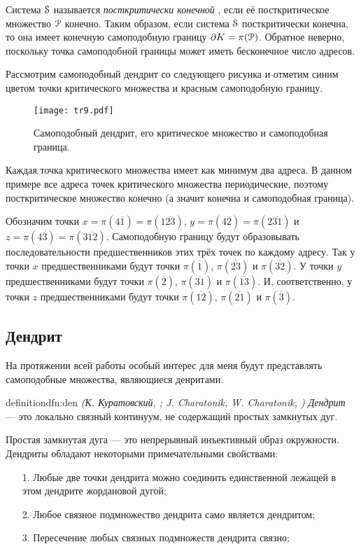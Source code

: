 Система ${\EuScript S}$ называется {\em посткритически конечной} \cite{Kig}, если её посткритическое множество ${\EuScript P}$ конечно. 
Таким образом, если система ${\EuScript S}$ посткритически конечна, то она имеет конечную самоподобную границу $\partial K=\pi({\EuScript P})$.
Обратное неверно, поскольку точка самоподобной границы может иметь бесконечное число адресов.

\begin{example}
Рассмотрим самоподобный дендрит со следующего рисунка и отметим синим цветом точки критического множества и красным самоподобную границу.
\begin{figure}[h!]
\centering
\texttt{[image: tr9.pdf]}
\caption{Самоподобный дендрит, его критическое множество и самоподобная граница.}
\end{figure}
Каждая точка критического множества имеет как минимум два адреса.
В данном примере все адреса точек критического множества периодические, поэтому посткритическое множество конечно (а значит конечна и самоподобная граница).

Обозначим точки $x=\pi(4\overline{1})=\pi(1\overline{23})$, $y=\pi(4\overline{2})=\pi(2\overline{31})$ и $z=\pi(4\overline{3})=\pi(3\overline{12})$.
Самоподобную границу будут образовывать последовательности предшественников этих трёх точек по каждому адресу.
Так у точки $x$ предшественниками будут точки $\pi(\overline{1})$, $\pi(\overline{23})$ и $\pi(\overline{32}).$
У точки $y$ предшественниками будут точки $\pi(\overline{2})$, $\pi(\overline{31})$ и $\pi(\overline{13}).$
И, соответственно, у точки $z$ предшественниками будут точки $\pi(\overline{12})$, $\pi(\overline{21})$ и $\pi(\overline{3})$.
\end{example}


\subsection{Дендрит}

На протяжении всей работы особый интерес для меня будут представлять самоподобные множества, являющиеся денритами. 

\begin{restatethis}{definition}{dfn:den} %
{\em (К. Куратовский, \cite{Kur1}; J. Charatonik, W. Charatonik, \cite{Char1998})}
{\em Дендрит} --- это локально связный континуум, не содержащий простых замкнутых дуг.     
\end{restatethis}

Простая замкнутая дуга --- это непрерывный инъективный образ окружности.
Дендриты обладают некоторыми примечательными свойствами:
\begin{enumerate}[nolistsep]
\item[1.] Любые две точки дендрита можно соединить единственной лежащей в этом дендрите жордановой дугой;
\item[2.] Любое связное подмножество дендрита само является дендритом;
\item[3.] Пересечение любых связных подмножеств дендрита связно;
\end{enumerate}


